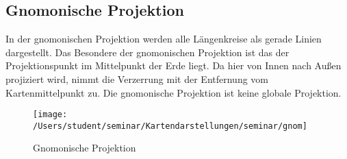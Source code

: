 \subsection{Gnomonische Projektion}
\label{sec:gnomic}
In der gnomonischen Projektion werden alle Längenkreise als gerade Linien dargestellt.
Das Besondere der gnomonischen Projektion ist das der Projektionspunkt im Mittelpunkt der Erde liegt.
Da hier von Innen nach Außen projiziert wird, nimmt die Verzerrung mit der Entfernung vom Kartenmittelpunkt zu. Die gnomonische Projektion ist keine globale Projektion.\\

\begin{figure}[hbtp]
\centering
\texttt{[image: /Users/student/seminar/Kartendarstellungen/seminar/gnom]} \caption{Gnomonische Projektion}
\end{figure}
\newpage 